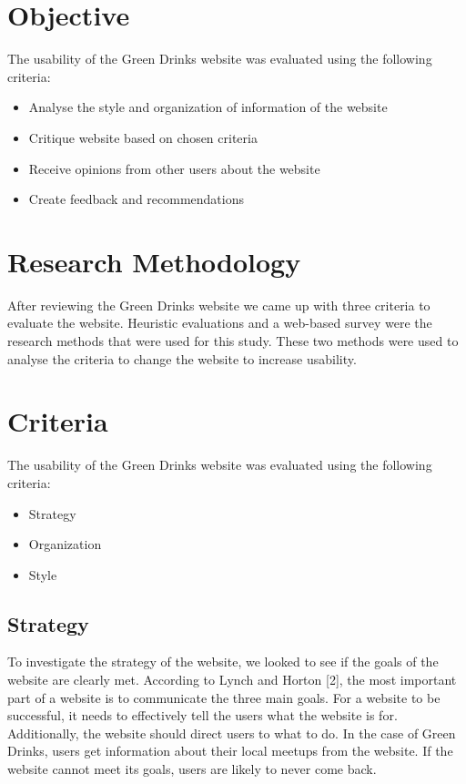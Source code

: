 \documentclass[12pt]{article}
\begin{document}
\section{Objective}
The usability of the Green Drinks website was evaluated using the following criteria:

\begin{itemize}
\item Analyse the style and organization of information of the website
\item Critique website based on chosen criteria
\item Receive opinions from other users about the website
\item Create feedback and recommendations
\end{itemize}
\section{Research Methodology}
After reviewing the Green Drinks website we came up with three criteria to evaluate the website. Heuristic evaluations and a web-based survey were the research methods that were used for this study. These two methods were used to analyse the criteria to change the website to increase usability.

\section{Criteria}
The usability of the Green Drinks website was evaluated using the following criteria:
\begin{itemize}
\item Strategy
\item Organization
\item Style
\end{itemize}
\subsection{Strategy}
To investigate the strategy of the website, we looked to see if the goals of the website are clearly met. According to Lynch and Horton [2], the most important part of a website is to communicate the three main goals. For a website to be successful, it needs to effectively tell the users what the website is for. Additionally, the website should direct users to what to do. In the case of Green Drinks, users get information about their local meetups from the website. If the website cannot meet its goals, users are likely to never come back.
\end{document}
